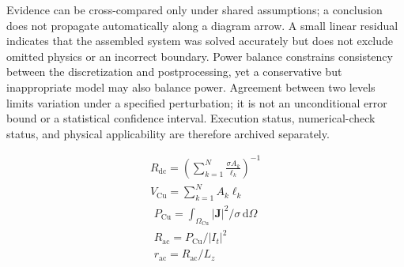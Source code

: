 \documentclass[journal,10pt]{IEEEtran}
\begin{document}
Evidence can be cross-compared only under shared assumptions; a conclusion does not propagate automatically along a diagram arrow. A small linear residual indicates that the assembled system was solved accurately but does not exclude omitted physics or an incorrect boundary. Power balance constrains consistency between the discretization and postprocessing, yet a conservative but inappropriate model may also balance power. Agreement between two levels limits variation under a specified perturbation; it is not an unconditional error bound or a statistical confidence interval. Execution status, numerical-check status, and physical applicability are therefore archived separately.


\hypertarget{E01}{}
\begin{equation}
\begin{gathered}
R_{\mathrm{dc}}=\left(\sum_{k=1}^{N}\frac{\sigma A_k}{\ell_k}\right)^{-1} \\
V_{\mathrm{Cu}}=\sum_{k=1}^{N}A_k\ell_k
\end{gathered}
\tag{1}\label{eq:E01}
\end{equation}
\hypertarget{E02}{}
\begin{equation}
\begin{gathered}
P_{\mathrm{Cu}}=\int_{\Omega_{\mathrm{Cu}}}|\mathbf J|^2/\sigma\,\mathrm d\Omega \\
R_{\mathrm{ac}}=P_{\mathrm{Cu}}/|I_t|^2 \\
r_{\mathrm{ac}}=R_{\mathrm{ac}}/L_z
\end{gathered}
\tag{2}\label{eq:E02}
\end{equation}
\end{document}
